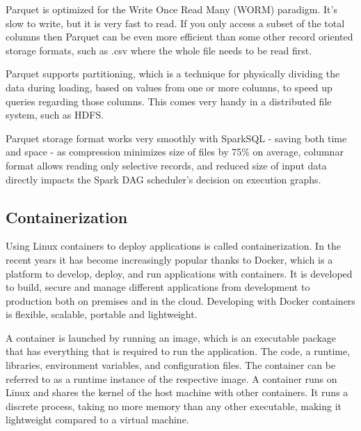 Parquet is optimized for the Write Once Read Many (WORM) paradigm. It’s slow to write, but it is very fast to read. If you only access a subset of the total columns then Parquet can be even more efficient than some other record oriented storage formats, such as .csv where the whole file needs to be read first. 

Parquet supports partitioning, which is a technique for physically dividing the data during loading, based on values from one or more columns, to speed up queries regarding those columns. This comes very handy in a distributed file system, such as HDFS.

Parquet storage format works very smoothly with SparkSQL - saving both time and space - as compression minimizes size of files by 75\% on average, columnar format allows reading only selective records, and reduced size of input data directly impacts the Spark DAG scheduler’s decision on execution graphs. \cite{ibm_parquet}

\subsection{Containerization}
Using Linux containers to deploy applications is called containerization. In the recent years it has become increasingly popular thanks to Docker, which is a platform to develop, deploy, and run applications with containers. It is developed to build, secure and manage different applications from development to production both on premises and in the cloud. Developing with Docker containers is flexible, scalable, portable and lightweight.

A container is launched by running an image, which is an executable package that has everything that is required to run the application. The code, a runtime, libraries, environment variables, and configuration files. The container can be referred to as a runtime instance of the respective image. A container runs on Linux and shares the kernel of the host machine with other containers. It runs a discrete process, taking no more memory than any other executable, making it lightweight compared to a virtual machine.\cite{docker}